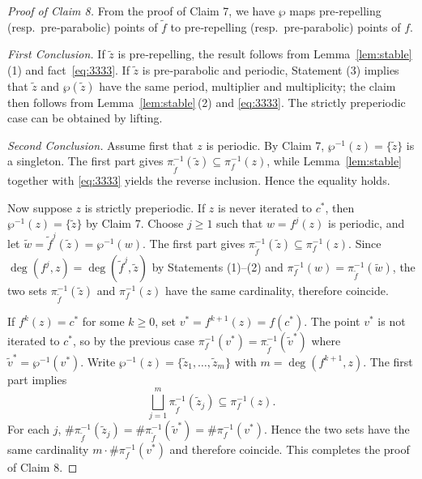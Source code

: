 \documentclass[a4paper,reqno,times, 11pt]{amsart}
\theoremstyle{remark}
\theoremstyle{plain}
\numberwithin{equation}{section}
\begin{document}
\begin{proof}[Proof of Claim 8]
From the proof of Claim 7, we have \(\wp\) maps pre‑repelling (resp.\ pre‑parabolic) points of \(\tilde f\) to pre‑repelling (resp.\ pre‑parabolic) points of \(f\).\vspace{3pt}

\noindent\emph{First Conclusion.}  
If \(\tilde z\) is pre‑repelling, the result follows from Lemma~\ref{lem:stable}\,(1) and fact~\eqref{eq:3333}.  
If \(\tilde z\) is pre‑parabolic and periodic, Statement (3) implies that \(\tilde z\) and \(\wp(\tilde z)\) have the same period, multiplier and multiplicity; the claim then follows from Lemma~\ref{lem:stable}\,(2) and \eqref{eq:3333}. The strictly preperiodic case can be obtained by lifting.\vspace{3pt}

\noindent\emph{Second Conclusion.}  
Assume first that \(z\) is periodic. By Claim 7, \(\wp^{-1}(z)=\{\tilde z\}\) is a singleton. The first part gives \(\pi_{\tilde f}^{-1}(\tilde z)\subseteq\pi_f^{-1}(z)\), while Lemma~\ref{lem:stable} together with \eqref{eq:3333} yields the reverse inclusion. Hence the equality holds.

Now suppose \(z\) is strictly preperiodic.  
If \(z\) is never iterated to \(c^*\), then \(\wp^{-1}(z)=\{\tilde z\}\) by Claim 7. Choose \(j\ge1\) such that \(w=f^j(z)\) is periodic, and let \(\tilde w=\tilde f^j(\tilde z)=\wp^{-1}(w)\). The first part gives \(\pi_{\tilde f}^{-1}(\tilde z)\subseteq\pi_f^{-1}(z)\). Since \(\deg(f^j,z)=\deg(\tilde f^j,\tilde z)\) by Statements (1)--(2) and \(\pi_f^{-1}(w)=\pi_{\tilde f}^{-1}(\tilde w)\), the two sets \(\pi_{\tilde f}^{-1}(\tilde z)\) and \(\pi_f^{-1}(z)\) have the same cardinality, therefore  coincide.

If \(f^k(z)=c^*\) for some \(k\ge0\), set \(v^*=f^{k+1}(z)=f(c^*)\). The point \(v^*\) is not iterated to \(c^*\), so by the previous case \(\pi_f^{-1}(v^*)=\pi_{\tilde f}^{-1}(\tilde v^*)\) where \(\tilde v^*=\wp^{-1}(v^*)\). Write \(\wp^{-1}(z)=\{\tilde z_1,\dots,\tilde z_m\}\) with \(m=\deg(f^{k+1},z)\). The first part implies  
\[
\bigsqcup_{j=1}^{m}\pi_{\tilde f}^{-1}(\tilde z_j)\subseteq\pi_f^{-1}(z).
\]  
For each \(j\), \(\#\pi_{\tilde f}^{-1}(\tilde z_j)=\#\pi_{\tilde f}^{-1}(\tilde v^*)=\#\pi_f^{-1}(v^*)\). Hence the two sets have the same cardinality $m\cdot\#\pi_f^{-1}(v^*)$ and therefore coincide. This completes the proof of Claim 8.
\end{proof}
\end{document}
